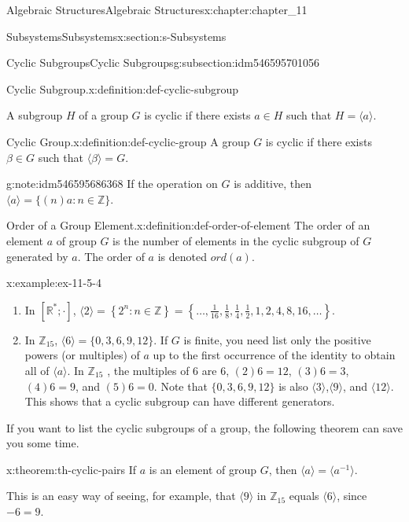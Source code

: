 \documentclass[oneside,10pt,]{book}
\numberwithin{equation}{section}
\begin{document}
\begin{chapterptx}{Algebraic Structures}{}{Algebraic Structures}{}{}{x:chapter:chapter_11}
\begin{sectionptx}{Subsystems}{}{Subsystems}{}{}{x:section:s-Subsystems}
\begin{subsectionptx}{Cyclic Subgroups}{}{Cyclic Subgroups}{}{}{g:subsection:idm546595701056}
\begin{definition}{Cyclic Subgroup.}{x:definition:def-cyclic-subgroup}
\par
A subgroup \(H\) of a group \(G\) is cyclic if there exists \(a \in  H\) such that \(H = \langle a \rangle\).%
\end{definition}
\begin{definition}{Cyclic Group.}{x:definition:def-cyclic-group}%
%
A group \(G\)  is cyclic if there exists \(\beta \in G\) such that \(\langle \beta \rangle=G\).%
\end{definition}
\begin{note}{}{g:note:idm546595686368}%
If the operation on \(G\) is additive, then \(\langle a \rangle = \{(n)a : n \in  \mathbb{Z}\}\).%
\end{note}
\begin{definition}{Order of a Group Element.}{x:definition:def-order-of-element}%
%
\label{g:notation:idm546595684112}%
The order of an element \(a\) of group \(G\) is the number of elements in the cyclic subgroup of \(G\) generated by \(a\). The order of \(a\) is denoted \(ord(a)\).%
\end{definition}
\begin{example}{}{x:example:ex-11-5-4}%
%
\begin{enumerate}[label=(\alph*)]
\item{}In \([\mathbb{R}^* ; \cdot ]\),  \(\langle 2 \rangle = \left\{2^n : n \in  \mathbb{Z}\right\} = \left\{\ldots ,\frac{1}{16}, \frac{1}{8} ,\frac{1}{4}, \frac{1}{2},
1, 2, 4, 8, 16,\ldots \right\}\).%
\item{}In \(\mathbb{Z}_{15}\), \(\langle 6 \rangle = \{0, 3, 6, 9, 12\}\).   If \(G\) is finite, you need list only the positive powers (or multiples) of \(a\) up to the first occurrence of the identity to obtain all of \(\langle a \rangle\). In \(\mathbb{Z}_{15}\) , the multiples of 6 are 6, \((2)6 = 12\), \((3)6=3\), \((4)6=9\), and \((5)6 = 0\). Note that \(\{0, 3, 6, 9, 12\}\) is also \(\langle 3 \rangle\),\(\langle 9 \rangle\), and \(\langle 12 \rangle\). This shows that a cyclic subgroup can have different generators.%
\end{enumerate}
%
\end{example}
If you want to list the cyclic subgroups of a group, the following theorem can save you some time.%
\begin{theorem}{}{}{x:theorem:th-cyclic-pairs}%
If \(a\) is an element of group \(G\), then \(\langle a \rangle = \langle a^{-1}\rangle\).%
\end{theorem}
This is an easy way of seeing, for example, that \(\langle 9 \rangle\) in \(\mathbb{Z}_{15}\) equals \(\langle 6 \rangle\), since \(-6 = 9\).%

\end{subsectionptx}
\end{sectionptx}
\end{chapterptx}
\end{document}
